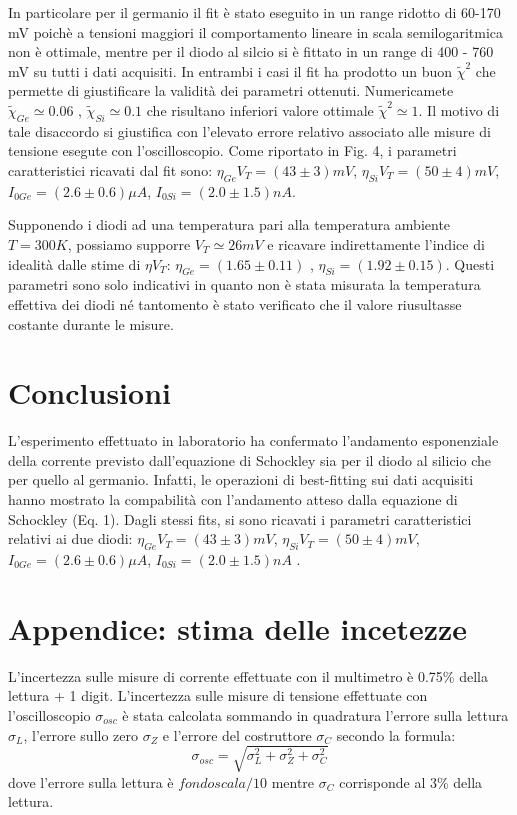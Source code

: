 \documentclass[a4paper,11pt]{article}
\begin{document}
In particolare per il germanio il fit è stato eseguito in un range ridotto di 60-170 mV poichè a tensioni maggiori il comportamento lineare in scala semilogaritmica non è ottimale, mentre per il diodo al silcio si è fittato in un range di 400 - 760 mV su tutti i dati acquisiti. In entrambi i casi il fit ha prodotto un buon $\tilde{\chi}^2$ che permette di giustificare la validità dei parametri ottenuti. Numericamete $\tilde{\chi}_{Ge} \simeq 0.06 $ , $\tilde{\chi}_{Si} \simeq 0.1 $ che risultano inferiori valore ottimale $\tilde{\chi}^2 \simeq 1 $. Il motivo di tale disaccordo si giustifica con l'elevato errore relativo associato alle misure di tensione esegute con l'oscilloscopio.
Come riportato in Fig. 4, i parametri caratteristici ricavati dal fit sono: $\eta_{Ge} V_T = (43\pm 3) mV$, $\eta_{Si} V_T= (50\pm 4) mV$, $I_{0 Ge} = (2.6\pm 0.6) \mu A$, $I_{0 Si} = (2.0\pm 1.5) nA$.

Supponendo i diodi ad una temperatura pari alla temperatura ambiente $T= 300K$, possiamo supporre $V_T \simeq 26 mV$ e ricavare indirettamente l'indice di idealità dalle stime di $\eta V_T$: $\eta_{Ge} = (1.65 \pm 0.11) $ ,  $\eta_{Si} = (1.92 \pm 0.15) $. Questi parametri sono solo indicativi in quanto non è stata misurata la temperatura effettiva dei diodi né tantomento è stato verificato che il valore riusultasse costante durante le misure.

\section{Conclusioni}
L'esperimento effettuato in laboratorio ha confermato l'andamento esponenziale della corrente previsto dall'equazione di Schockley sia per il diodo al silicio che per quello al germanio.
Infatti, le operazioni di best-fitting sui dati acquisiti hanno mostrato la compabilità con l'andamento atteso dalla equazione di Schockley (Eq. 1). Dagli stessi fits, si sono ricavati i parametri caratteristici relativi ai due diodi: $\eta_{Ge} V_T = (43\pm 3) mV$, $\eta_{Si} V_T= (50\pm 4) mV$, $I_{0 Ge} = (2.6\pm 0.6) \mu A$, $I_{0 Si} = (2.0\pm 1.5) nA$ .

\section*{Appendice: stima delle incetezze}
L'incertezza sulle misure di corrente effettuate con il multimetro è 0.75\% della lettura + 1 digit. L'incertezza sulle misure di tensione effettuate con l'oscilloscopio $\sigma_{osc}$ è stata calcolata sommando in quadratura l'errore sulla lettura $\sigma_L$, l'errore sullo zero $\sigma_Z$ e l'errore del costruttore $\sigma_C$ secondo la formula:
\begin{equation}
  \sigma_{osc} = \sqrt{\sigma_{L}^2+ \sigma_{Z}^2+ \sigma_{C}^2}
\end{equation}
dove l'errore sulla lettura è $fondo scala / 10$ mentre $\sigma_{C}$ corrisponde al 3\% della lettura.
\end{document}

